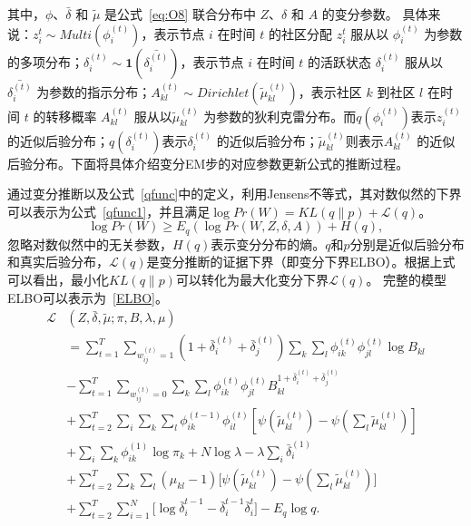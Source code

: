 其中，$\phi$、$\bar{\delta}$ 和 $\tilde{\mu}$ 是公式~\ref{eq:O8} 联合分布中 $Z$、$\delta$ 和 $A$ 的变分参数。  
具体来说：$z_i^t \sim Multi(\phi_i^{(t)})$，表示节点 $i$ 在时间 $t$ 的社区分配 $z_i^t$ 服从以 $\phi_i^{(t)}$ 为参数的多项分布；$\delta_i^{(t)} \sim \mathbf{1}(\bar{\delta_i^{(t)}})$，表示节点 $i$ 在时间 $t$ 的活跃状态 $\delta_i^{(t)}$ 服从以 $\bar{\delta_i^{(t)}}$ 为参数的指示分布；$A_{kl}^{(t)} \sim Dirichlet(\tilde{\mu}_{kl}^{(t)})$，表示社区 $k$ 到社区 $l$ 在时间 $t$ 的转移概率 $A_{kl}^{(t)}$ 服从以$\tilde{\mu}_{kl}^{(t)}$ 为参数的狄利克雷分布。而$q(\phi_i^{(t)})$表示$z_i^{(t)}$ 的近似后验分布；$q(\delta_i^{(t)})$表示$\delta_i^{(t)}$ 的近似后验分布；$\tilde{\mu}_{kl}^{(t)}$则表示$A_{kl}^{(t)}$ 的近似后验分布。下面将具体介绍变分EM步的对应参数更新公式的推断过程。

通过变分推断以及公式~\ref{qfunc}中的定义，利用Jensens不等式，其对数似然的下界可以表示为公式~\ref{qfunc1}，并且满足$\log Pr(W) = KL(q \| p) + \mathscr{L}(q)$。  
\begin{equation}
\log Pr(W)\ge E_q(\log Pr(W, Z,\delta, A) ) + H(q),
\label{qfunc1}
\end{equation}
忽略对数似然中的无关参数，$H(q)$表示变分分布的熵。$q$和$p$分别是近似后验分布和真实后验分布，$\mathscr{L}(q)$是变分推断的证据下界（即变分下界ELBO）。根据上式可以看出，最小化$KL(q \| p)$可以转化为最大化变分下界$\mathscr{L}(q)$。  
完整的模型ELBO可以表示为~\ref{ELBO}。
\begin{align}
 \mathscr{L} & (Z,\bar{\delta},\tilde{\mu};\pi,B,\lambda,\mu) \nonumber \\
& = \sum_{t=1}^T \sum_{w_{ij}^{(t)}=1} (1+\bar{\delta}_i^{(t)}+\bar{\delta}_j^{(t)}) \sum_k \sum_l \phi_{ik}^{(t)}\phi_{jl}^{(t)} \log B_{kl} \nonumber\\
& -\sum_{t=1}^T \sum_{w_{ij}^{(t)}=0} \sum_k \sum_l \phi_{ik}^{(t)}\phi_{jl}^{(t)}  B_{kl}^{1+\bar{\delta}_i^{(t)}+\bar{\delta}_j^{(t)}} \nonumber\\
& +\sum_{t=2}^T \sum_i \sum_k \sum_l \phi_{ik}^{(t-1)}\phi_{il}^{(t)} [\psi(\tilde{\mu}_{kl}^{(t)}) - \psi(\sum_l \tilde{\mu}_{kl}^{(t)})]  \nonumber\\
& +\sum_i \sum_k \phi_{ik}^{(1)} \log \pi_k +  N\log \lambda -\lambda \sum_i \bar{\delta}_i^{(1)}  \nonumber \\
& +\sum_{t=2}^T \sum_k \sum_l(\mu_{kl} - 1) \Big[\psi(\tilde{\mu}_{kl}^{(t)}) - \psi(\sum_l \tilde{\mu}_{kl}^{(t)})\Big]  \nonumber\\
& + \sum_{t=2}^{T} \sum_{i=1}^N \big[\log \bar{\delta}_i^{t-1} - \bar{\delta}_i^{t-1} \bar{\delta}_i^{t}\big] -E_q \log q.
\label{ELBO}
\end{align}


